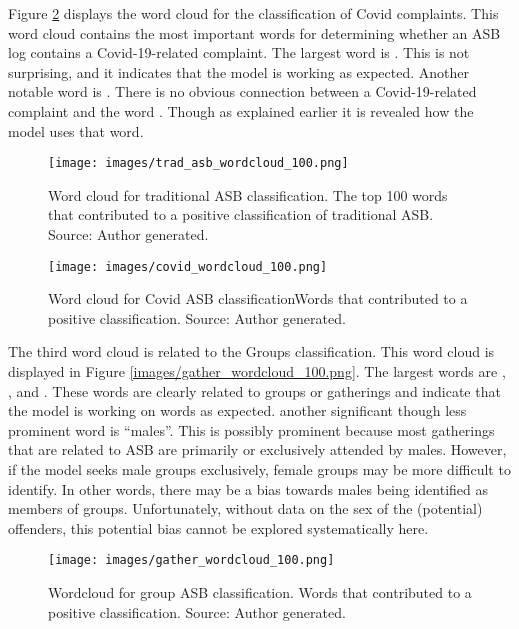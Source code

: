 Figure \ref{fig: wordcloud_covid} displays the word cloud for the classification of Covid complaints. This word cloud contains the most important words for determining whether an ASB log contains a Covid-19-related complaint. The largest word is . This is not surprising, and it indicates that the model is working as expected. Another notable word is . There is no obvious connection between a Covid-19-related complaint and the word . Though as explained earlier it is revealed how the model uses that word.

\begin{figure}[h]
    \texttt{[image: images/trad\_asb\_wordcloud\_100.png]}
    \caption[Word cloud for traditional ASB classification.]{{Word cloud for traditional ASB classification.} The top 100 words that contributed to a positive classification of traditional ASB. Source: Author generated.}
    \label{fig: wordcloud_trad}
\end{figure}



\begin{figure}[h]
    \centering
    \texttt{[image: images/covid\_wordcloud\_100.png]}
    \caption[Word cloud for Covid ASB classification]{{Word cloud for Covid ASB classification}Words that contributed to a positive classification. Source: Author generated.}
    \label{fig: wordcloud_covid}
\end{figure}

The third word cloud is related to the Groups classification. This word cloud is displayed in Figure \ref{images/gather_wordcloud_100.png}. The largest words are , , and . These words are clearly related to groups or gatherings and indicate that the model is working on words as expected. another significant though less prominent word is “males”. This is possibly prominent because most gatherings that are related to ASB are primarily or exclusively attended by males. However, if the model seeks male groups exclusively, female groups may be more difficult to identify. In other words, there may be a bias towards males being identified as members of groups. Unfortunately, without data on the sex of the (potential) offenders, this potential bias cannot be explored systematically here.

\begin{figure}[h]
    \texttt{[image: images/gather\_wordcloud\_100.png]}
    \caption[Wordcloud for group ASB classification.]{{Wordcloud for group ASB classification.} Words that contributed to a positive classification. Source: Author generated.}
    \label{fig: wordcloud_gather}
\end{figure}
   


